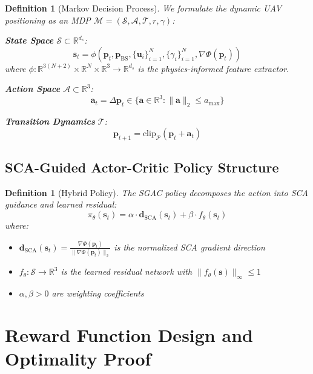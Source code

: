 \documentclass[11pt,a4paper]{article}
\newtheorem{definition}[theorem]{Definition}
\newcommand{\R}{\mathbb{R}}
\newcommand{\calP}{\mathcal{P}}
\newcommand{\calS}{\mathcal{S}}
\newcommand{\calA}{\mathcal{A}}
\newcommand{\calT}{\mathcal{T}}
\newcommand{\calM}{\mathcal{M}}
\newcommand{\bs}{\mathbf{s}}
\newcommand{\ba}{\mathbf{a}}
\newcommand{\bp}{\mathbf{p}}
\newcommand{\bu}{\mathbf{u}}
\newcommand{\dsca}{\mathbf{d}_{\text{SCA}}}
\newcommand{\pbs}{\mathbf{p}_{\text{BS}}}
\begin{document}
\begin{definition}[Markov Decision Process]
We formulate the dynamic UAV positioning as an MDP $\calM = (\calS, \calA, \calT, r, \gamma)$:

\textbf{State Space} $\calS \subset \R^{d_s}$:
\begin{equation}
    \bs_t = \phi(\bp_t, \pbs, \{\bu_i\}_{i=1}^N, \{\gamma_i\}_{i=1}^N, \nabla\Phi(\bp_t))
\end{equation}
where $\phi: \R^{3(N+2)} \times \R^N \times \R^3 \rightarrow \R^{d_s}$ is the physics-informed feature extractor.

\textbf{Action Space} $\calA \subset \R^3$:
\begin{equation}
    \ba_t = \Delta\bp_t \in \{\ba \in \R^3 : \|\ba\|_2 \leq a_{\max}\}
\end{equation}

\textbf{Transition Dynamics} $\calT$:
\begin{equation}
    \bp_{t+1} = \text{clip}_{\calP}(\bp_t + \ba_t)
\end{equation}
\end{definition}

\subsection{SCA-Guided Actor-Critic Policy Structure}

\begin{definition}[Hybrid Policy]
The SGAC policy decomposes the action into SCA guidance and learned residual:
\begin{equation}
    \pi_\theta(\bs_t) = \alpha \cdot \dsca(\bs_t) + \beta \cdot f_\theta(\bs_t)
\end{equation}
where:
\begin{itemize}
    \item $\dsca(\bs_t) = \frac{\nabla\Phi(\bp_t)}{\|\nabla\Phi(\bp_t)\|_2}$ is the normalized SCA gradient direction
    \item $f_\theta: \calS \rightarrow \R^3$ is the learned residual network with $\|f_\theta(\bs)\|_\infty \leq 1$
    \item $\alpha, \beta > 0$ are weighting coefficients
\end{itemize}
\end{definition}

\section{Reward Function Design and Optimality Proof}
\end{document}
